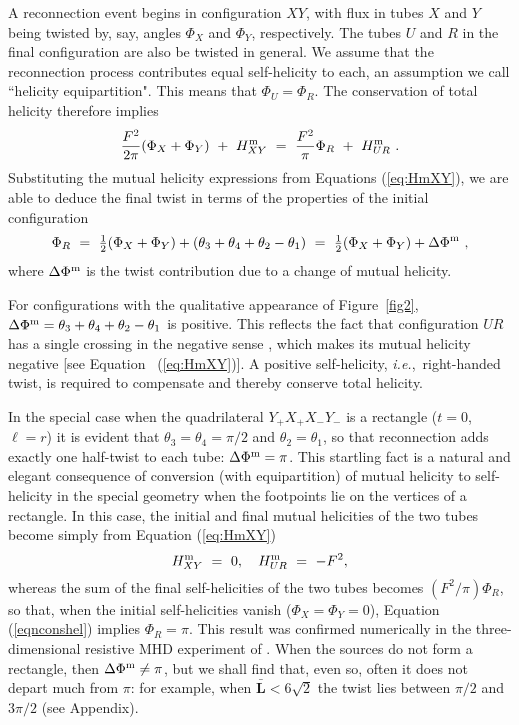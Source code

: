 \documentclass[10pt,namedreferneces]{SolarPhysics}
\begin{document}
\begin{article}
A reconnection event begins in configuration $XY$, with flux in tubes $X$ and $Y$ being twisted by, say, 
angles $\Phi_X$ and $\Phi_Y$, respectively.  The tubes $U$ and $R$ in the final configuration are also be twisted in general.  We  assume that the reconnection process contributes equal self-helicity to each, an assumption we call 
``helicity equipartition".  This means that $\Phi_U=\Phi_R$.  The conservation of total helicity therefore implies
\begin{equation}
  {F^2\over2\pi}(\Phi_X+\Phi_Y) ~+~ H^{\rm m}_{XY} ~=~ {F^2\over\pi}\Phi_R ~+~ H^{\rm m}_{UR} ~.
  \label{eqnconshel}
\end{equation}
Substituting the mutual helicity expressions from Equations (\ref{eq:HmXY}), we are able to deduce the final twist in terms of the properties of the initial configuration
\begin{equation}
  \Phi_R ~=~ \hbox{${1\over2}$}(\Phi_X+\Phi_Y) + (\theta_3+\theta_4+\theta_2-\theta_1) ~=~ \hbox{${1\over2}$}
  (\Phi_X+\Phi_Y) +\Delta\Phi^{\rm m} ~,
\end{equation}
where $\Delta\Phi^{\rm m}$ is the twist contribution due to a change of mutual helicity.

For configurations with the qualitative appearance of Figure\ \ref{fig2}, 
$\Delta\Phi^{\rm m}=\theta_3+\theta_4+\theta_2-\theta_1$ is positive.  This reflects the fact that configuration $UR$ has a single crossing in the negative sense \cite{berger93,berger06}, which makes its mutual helicity negative [see Equation \ (\ref{eq:HmXY})].  A positive self-helicity, \textit{i.e.},\  right-handed twist, is required to compensate and thereby conserve total helicity.  

In the special case when the quadrilateral $Y_+X_+X_-Y_-$ is a rectangle ($t=0$, $\ell=r$) it is evident that $\theta_3=\theta_4=\pi/2$ and $\theta_2=\theta_1$, so that reconnection adds exactly one half-twist to each tube: $\Delta\Phi^{\rm m}=\pi$. 
This startling fact is a natural and elegant consequence of conversion (with equipartition) of mutual helicity to self-helicity in the special geometry when the footpoints lie on the vertices of a rectangle.  In this case, the initial and final mutual helicities of the two tubes become simply from Equation (\ref{eq:HmXY})
\begin{equation}
  H^{\rm m}_{XY} ~=~ 0,~~~ H^{\rm m}_{UR} ~=~ -F^2,
\end{equation}
whereas the sum of the final self-helicities of the two tubes becomes $(F^2/\pi)\Phi_R$,
so that, when the initial self-helicities vanish ($\Phi_X=\Phi_Y=0$), Equation (\ref{eqnconshel}) implies $\Phi_R=\pi$. This result was confirmed numerically in the three-dimensional resistive MHD experiment of .
When the sources do not form a rectangle, then $\Delta\Phi^{\rm m}\neq \pi$, but  we shall find that, even so, often it does not depart much from $\pi$: for example, when ${\bm\bar L}<6\sqrt 2$ the twist lies between $\pi/2$ and  $3\pi/2$ (see Appendix).


\end{article}
\end{document}
